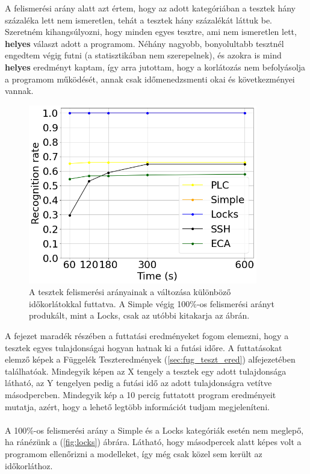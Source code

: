 A felismerési arány alatt azt értem, hogy az adott kategóriában a tesztek hány százaléka lett nem ismeretlen, tehát a tesztek hány százalékát láttuk be. Szeretném kihangsúlyozni, hogy minden egyes tesztre, ami nem ismeretlen lett, \textbf{helyes} választ adott a programom. Néhány nagyobb, bonyolultabb tesztnél engedtem végig futni (a statisztikában nem szerepelnek), és azokra is mind \textbf{helyes} eredményt kaptam, így arra jutottam, hogy a korlátozás nem befolyásolja a programom működését, annak csak időmenedzsmenti okai és következményei vannak.
\\
\begin{figure}[!ht]
	\centering
	\includegraphics[width=100mm, keepaspectratio]{figures/fig_rec_rate_during_time.png}
	\caption{A tesztek felismerési arányainak a változása különböző időkorlátokkal futtatva. A Simple végig 100\%-os felismerési arányt produkált, mint a Locks, csak az utóbbi kitakarja az ábrán.}
	\label{fig:rec_rate_during_time}
\end{figure}

\clearpage

A fejezet maradék részében a futtatási eredményeket fogom elemezni, hogy a tesztek egyes tulajdonságai hogyan hatnak ki a futási időre. A futtatásokat elemző képek a Függelék Teszteredmények (\ref{sec:fug_teszt_ered}) alfejezetében találhatóak. Mindegyik képen az X tengely a tesztek egy adott tulajdonsága látható, az Y tengelyen pedig a futási idő az adott tulajdonságra vetítve másodpercben. Mindegyik kép a 10 percig futtatott program eredményeit mutatja, azért, hogy a lehető legtöbb információt tudjam megjeleníteni.
\\
\\
A 100\%-os felismerési arány a Simple és a Locks kategóriák esetén nem meglepő, ha ránézünk a (\ref{fig:locks}) ábrára. Látható, hogy másodpercek alatt képes volt a programom ellenőrizni a modelleket, így még csak közel sem került az időkorláthoz.

